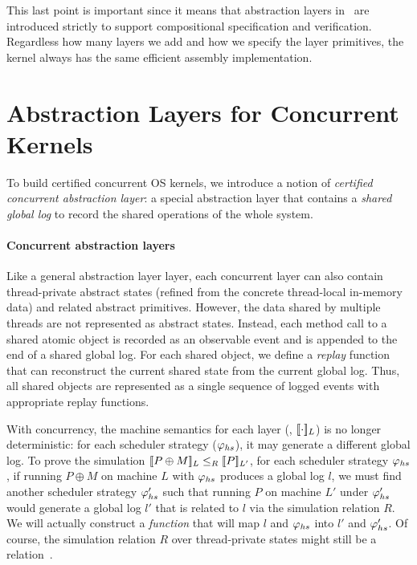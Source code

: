This last point is important since it means that abstraction
layers in \CTOS\ are introduced strictly to support compositional 
specification and verification. Regardless how many layers we add 
and how we specify the layer primitives, the kernel always has the same 
efficient assembly implementation.

\section{Abstraction Layers for Concurrent Kernels}
\label{sec:overview:concurrent}
To build certified concurrent OS kernels,
we introduce a notion of \emph{certified concurrent abstraction
layer}: a special abstraction layer that 
contains a \emph{shared
global log} to record the shared operations
of the whole system.

\paragraph{Concurrent abstraction layers}
Like a general abstraction layer layer, each concurrent layer can also
contain thread-private abstract states (refined from the concrete
thread-local in-memory data) and related abstract primitives. However,
the data shared by multiple threads are not represented as abstract
states. Instead, each method call to a shared atomic object is
recorded as an observable event and is appended to the end of a shared
global log. For each shared object, we define a {\em replay} function
that can reconstruct the current shared state from the current global
log. Thus, all shared objects are represented as a single sequence of
logged events with appropriate replay functions.

With concurrency, the machine semantics for each layer (\eg,
$\sem{L}{\cdot}$) is no longer deterministic: for each scheduler
strategy ($\strat{hs}$), it may generate a different global
log. To prove the simulation $\sem{L}{P\oplus{}M} \leq_R \sem{L'}{P}$,
for each scheduler strategy $\strat{hs}$, if running $P\oplus{}M$ on
machine $L$ with $\strat{hs}$ produces a global log $l$, we must find
another scheduler strategy $\stratp{hs}$ such that running $P$ on
machine $L'$ under $\stratp{hs}$ would generate a global log $l'$ that
is related to $l$ via the simulation relation $R$. We will actually
construct a {\em function} that will map $l$ and $\strat{hs}$ into
$l'$ and $\stratp{hs}$. Of course, the simulation relation $R$ over
thread-private states might still be a relation~\cite{dscal15}.

